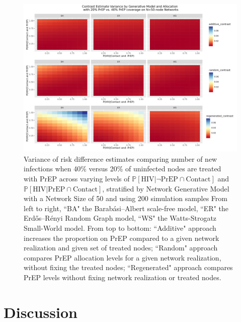 \documentclass{article}
\theoremstyle{definition}
\begin{document}
\begin{figure}[H]
    \centering
    \includegraphics[width=\linewidth]{Corrected Figures/Generative Model Variance Plot.png}
    \caption{Variance of risk difference estimates comparing number of new infections when 40\% versus 20\% of uninfected nodes are treated with PrEP across varying levels of $\mathbb{P}\left[\text{HIV} \vert \neg \text{PrEP} \cap \text{Contact}\right]$ and $\mathbb{P}\left[\text{HIV} \vert \text{PrEP} \cap \text{Contact}\right]$, stratified by Network Generative Model with a Network Size of 50 and using 200 simulation samples %
    From left to right, ``BA" the Barabási–Albert scale-free model, ``ER" the Erdős–Rényi Random Graph model, ``WS" the Watts-Strogatz Small-World model. From top to bottom: ``Additive" approach increases the proportion on PrEP compared to a given network realization and given set of treated nodes; ``Random" approach compares PrEP allocation levels for a given network realization, without fixing the treated nodes; ``Regenerated" approach compares PrEP levels without fixing network realization or treated nodes. 
    }
    \label{fig:Figure 12}
\end{figure}


\section{Discussion}
\end{document}
